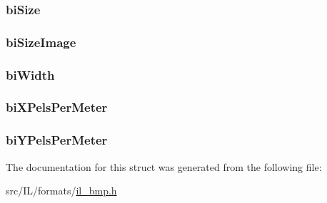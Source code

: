 \hypertarget{struct_b_m_p_h_e_a_d_a674d07d4c9ee80cbd8137b158d1e4131}{
\subsubsection[{bi\-Size}]{ bi\-Size}}\label{struct_b_m_p_h_e_a_d_a674d07d4c9ee80cbd8137b158d1e4131}
\hypertarget{struct_b_m_p_h_e_a_d_ad5c25e0affca0d61f43a666c8743cbba}{
\subsubsection[{bi\-Size\-Image}]{ bi\-Size\-Image}}\label{struct_b_m_p_h_e_a_d_ad5c25e0affca0d61f43a666c8743cbba}
\hypertarget{struct_b_m_p_h_e_a_d_ab7111bf17fcc4d7f6e39087952a1928e}{
\subsubsection[{bi\-Width}]{ bi\-Width}}\label{struct_b_m_p_h_e_a_d_ab7111bf17fcc4d7f6e39087952a1928e}
\hypertarget{struct_b_m_p_h_e_a_d_abc616e464112a4e8c039ee54fb0c52fe}{
\subsubsection[{bi\-X\-Pels\-Per\-Meter}]{ bi\-X\-Pels\-Per\-Meter}}\label{struct_b_m_p_h_e_a_d_abc616e464112a4e8c039ee54fb0c52fe}
\hypertarget{struct_b_m_p_h_e_a_d_ad1c4d73c80f483104695e4eda7a2228b}{
\subsubsection[{bi\-Y\-Pels\-Per\-Meter}]{ bi\-Y\-Pels\-Per\-Meter}}\label{struct_b_m_p_h_e_a_d_ad1c4d73c80f483104695e4eda7a2228b}


The documentation for this struct was generated from the following file\-:\begin{DoxyCompactItemize}
\item 
src/\-I\-L/formats/\hyperlink{il__bmp_8h}{il\-\_\-bmp.\-h}\end{DoxyCompactItemize}
